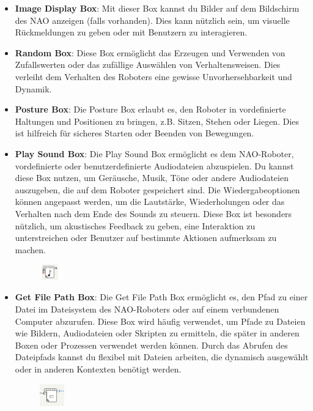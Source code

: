 \begin{itemize}
    \item \textbf{Image Display Box}: Mit dieser Box kannst du Bilder auf dem Bildschirm des NAO anzeigen (falls vorhanden). Dies kann nützlich sein, um visuelle Rückmeldungen zu geben oder mit Benutzern zu interagieren.
    \item \textbf{Random Box}: Diese Box ermöglicht das Erzeugen und Verwenden von Zufallswerten oder das zufällige Auswählen von Verhaltensweisen. Dies verleiht dem Verhalten des Roboters eine gewisse Unvorhersehbarkeit und Dynamik.
    \item \textbf{Posture Box}: Die Posture Box erlaubt es, den Roboter in vordefinierte Haltungen und Positionen zu bringen, z.B. Sitzen, Stehen oder Liegen. Dies ist hilfreich für sicheres Starten oder Beenden von Bewegungen.
    \item \textbf{Play Sound Box}: Die Play Sound Box ermöglicht es dem NAO-Roboter, vordefinierte oder benutzerdefinierte Audiodateien abzuspielen. Du kannst diese Box nutzen, um Geräusche, Musik, Töne oder andere Audiodateien auszugeben, die auf dem Roboter gespeichert sind. Die Wiedergabeoptionen können angepasst werden, um die Lautstärke, Wiederholungen oder das Verhalten nach dem Ende des Sounds zu steuern. Diese Box ist besonders nützlich, um akustisches Feedback zu geben, eine Interaktion zu unterstreichen oder Benutzer auf bestimmte Aktionen aufmerksam zu machen.
    \begin{figure}[h]
        \centering
        \includegraphics[width=0.1\textwidth]{../images/playSoundBox.png}
        \label{fig:playSoundBox}
    \end{figure}
    \item \textbf{Get File Path Box}: Die Get File Path Box ermöglicht es, den Pfad zu einer Datei im Dateisystem des NAO-Roboters oder auf einem verbundenen Computer abzurufen. Diese Box wird häufig verwendet, um Pfade zu Dateien wie Bildern, Audiodateien oder Skripten zu ermitteln, die später in anderen Boxen oder Prozessen verwendet werden können. Durch das Abrufen des Dateipfads kannst du flexibel mit Dateien arbeiten, die dynamisch ausgewählt oder in anderen Kontexten benötigt werden.
    \begin{figure}[h]
        \centering
        \includegraphics[width=0.1\textwidth]{../images/getFilePathBox.png}

\end{figure}
\end{itemize}
